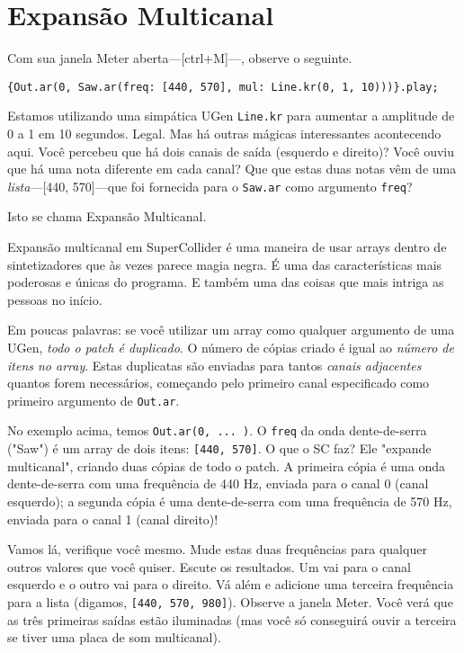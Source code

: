 \section{Expansão Multicanal}

Com sua janela Meter aberta---[ctrl+M]---, observe o seguinte.

\begin{lstlisting}[style=SuperCollider-IDE, basicstyle=\scttfamily\footnotesize]
{Out.ar(0, Saw.ar(freq: [440, 570], mul: Line.kr(0, 1, 10)))}.play;
\end{lstlisting}

Estamos utilizando uma simpática UGen \texttt{Line.kr} para aumentar a amplitude de 0 a 1 em 10 segundos. Legal. Mas há outras mágicas interessantes acontecendo aqui. Você percebeu que há dois canais de saída (esquerdo e direito)? Você ouviu que há uma nota diferente em cada canal? Que que estas duas notas vêm de uma \emph{lista}---[440, 570]---que foi fornecida para o \texttt{Saw.ar} como argumento \texttt{freq}?

Isto se chama Expansão Multicanal.

Expansão multicanal em SuperCollider é uma maneira de usar arrays dentro de sintetizadores que às vezes parece magia negra. É uma das características mais poderosas e únicas do programa. E também uma das coisas que mais intriga as pessoas no início.

Em poucas palavras: se você utilizar um array como qualquer argumento de uma UGen, \emph{todo o patch é duplicado}. O número de cópias criado é igual ao \textit{número de itens no array}. Estas duplicatas são enviadas para tantos \textit{canais adjacentes} quantos forem necessários, começando pelo primeiro canal especificado como primeiro argumento de \texttt{Out.ar}.

No exemplo acima, temos \texttt{Out.ar(0, ... )}. O \texttt{freq} da onda dente-de-serra ("Saw") é um array de dois itens: \texttt{[440, 570]}. O que o SC faz? Ele "expande multicanal", criando duas cópias de todo o patch. A primeira cópia é uma onda dente-de-serra com uma frequência de 440 Hz, enviada para o canal 0 (canal esquerdo); a segunda cópia é uma dente-de-serra com uma frequência de 570 Hz, enviada para o canal 1 (canal direito)!

Vamos lá, verifique você mesmo. Mude estas duas frequências para qualquer outros valores que você quiser. Escute os resultados. Um vai para o canal esquerdo e o outro vai para o direito. Vá além e adicione uma terceira frequência para a lista (digamos, \texttt{[440, 570, 980]}). Observe a janela Meter. Você verá que as três primeiras saídas estão iluminadas (mas você só conseguirá ouvir a terceira se tiver uma placa de som multicanal).


